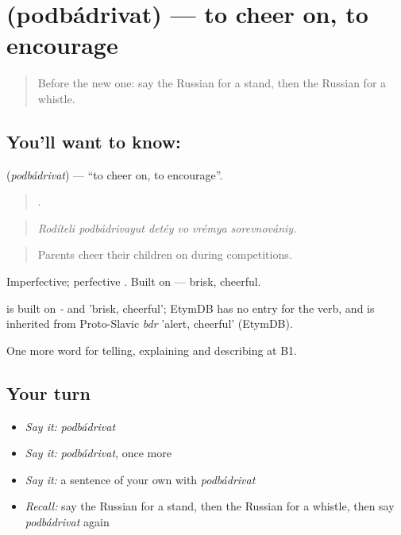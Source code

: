 \section[\texorpdfstring{\ru{подбадривать} (podbádrivat)}{подбадривать (podbádrivat)}]{ (podbádrivat) — to cheer on, to encourage}

\label{lesson:RU-C508-podbadrivat}



\begin{quote}
Before the new one: say the Russian for a stand, then the Russian for a whistle.
\end{quote}

\subsection*{You'll want to know: }
\textbf{} (\emph{podbádrivat}) — \textquotedblleft{}to cheer on, to encourage\textquotedblright{}.

\begin{quote}
     .
\end{quote}

\begin{quote}
\emph{Rodíteli podbádrivayut detéy vo vrémya sorevnovániy.}
\end{quote}

\begin{quote}
Parents cheer their children on during competitions.
\end{quote}

Imperfective; perfective . Built on \emph{} — brisk, cheerful.

\begin{cousinweb}
\emph{} is built on \emph{-} and \emph{} 'brisk, cheerful'; EtymDB has no entry for the verb, and \emph{} is inherited from Proto-Slavic \emph{bdr} 'alert, cheerful' (EtymDB).
\end{cousinweb}

\begin{grammarlens}[title={What you've built}]
One more word for telling, explaining and describing at B1.
\end{grammarlens}

\subsection*{Your turn}
\begin{itemize}
\raggedright
  \item \emph{Say it:} \emph{podbádrivat}
  \item \emph{Say it:} \emph{podbádrivat}, once more
  \item \emph{Say it:} a sentence of your own with \emph{podbádrivat}
  \item \emph{Recall:} say the Russian for a stand, then the Russian for a whistle, then say \emph{podbádrivat} again
\end{itemize}

